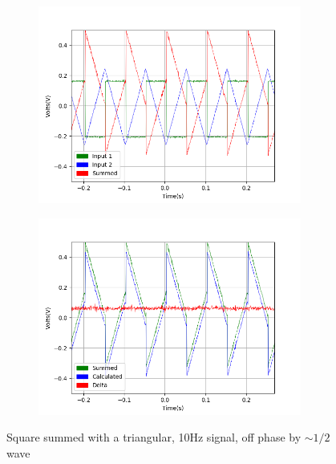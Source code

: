 \begin{figure}[h!]
\centering
\begin{subfigure}[t]{.475\textwidth}
  \centering
  \includegraphics[width=0.95\textwidth, height=0.25\textheight]{figures/Summing/scope_11raw.png}
 \label{fig:sum_11_og_data}
\end{subfigure}\hfill
\begin{subfigure}[t]{.475\textwidth}
  \centering
  \includegraphics[width=0.95\textwidth, height=0.25\textheight]{figures/Summing/scope_11.png}
\label{fig:sum_11_calc_data}
\end{subfigure}
\caption{Square summed with a triangular, 10Hz signal, off phase by $\sim1/2$ wave}
\label{fig:sum_11}
\end{figure}

